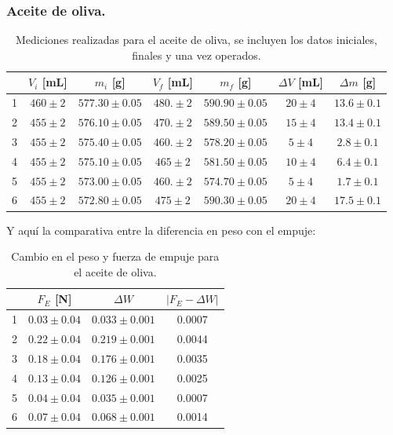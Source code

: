 \documentclass[a4paper]{article}
\begin{document}
\subsubsection*{Aceite de oliva.}
\begin{table}[H]
  \centering
    \begin{tabular}{|c|c|c|c|c|c|c|} \hline
     & $V_i$ [mL] & $m_i$ [g] & $V_f$ [mL] & $m_f$ [g] & $\Delta V$ [mL] & $\Delta m$ [g] \\ \hline
    1     & $460\pm2$ & $577.30\pm0.05$ & $480.\pm2$ & $590.90\pm0.05$ & $20\pm4$ & $13.6\pm0.1$ \\ \hline
    2     & $455\pm2$ & $576.10\pm0.05$ & $470.\pm2$ & $589.50\pm0.05$ & $15\pm4$ & $13.4\pm0.1$ \\ \hline
    3     & $455\pm2$ & $575.40\pm0.05$ & $460.\pm2$ & $578.20\pm0.05$ & $5\pm4$ & $2.8\pm0.1$ \\ \hline
    4     & $455\pm2$ & $575.10\pm0.05$ & $465\pm2$ & $581.50\pm0.05$ & $10\pm4$ & $6.4\pm0.1$ \\ \hline
    5     & $455\pm2$ & $573.00\pm0.05$ & $460.\pm2$ & $574.70\pm0.05$ & $5\pm4$ & $1.7\pm0.1$ \\ \hline
    6     & $455\pm2$ & $572.80\pm0.05$ & $475\pm2$ & $590.30\pm0.05$ & $20\pm4$ & $17.5\pm0.1$ \\ \hline
    \end{tabular}%
  \caption{Mediciones realizadas para el aceite de oliva, se incluyen los datos iniciales, finales y una vez operados.}
\end{table}%

Y aquí la comparativa entre la diferencia en peso con el empuje:
\begin{table}[H]
  \centering
    \begin{tabular}{|c|c|c|c|} \hline
          & $F_E$ [N] & $\Delta W$ & $| F_E - \Delta W |$ \\ \hline
    1     & $0.03\pm0.04$ & $0.033\pm0.001$ & 0.0007 \\ \hline
    2     & $0.22\pm0.04$ & $0.219\pm0.001$ & 0.0044 \\ \hline
    3     & $0.18\pm0.04$ & $0.176\pm0.001$ & 0.0035 \\ \hline
    4     & $0.13\pm0.04$ & $0.126\pm0.001$ & 0.0025 \\ \hline
    5     & $0.04\pm0.04$ & $0.035\pm0.001$ & 0.0007 \\ \hline
    6     & $0.07\pm0.04$ & $0.068\pm0.001$ & 0.0014 \\ \hline
    \end{tabular}%
  \caption{Cambio en el peso y fuerza de empuje para el aceite de oliva.}
\end{table}%
\end{document}
